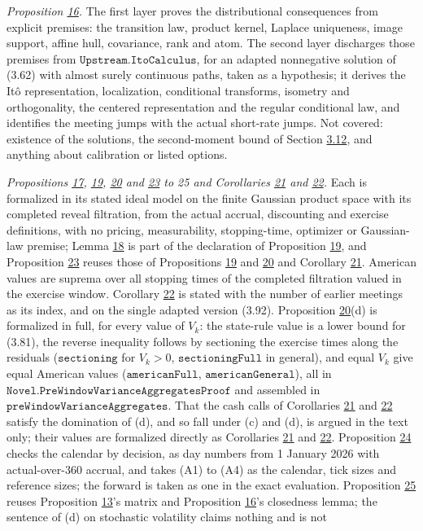 \documentclass[11pt]{article}
\begin{document}
\emph{Proposition \hyperref[res:Proposition-16]{16}.} The first layer proves the distributional consequences from explicit premises: the transition law, product kernel, Laplace uniqueness, image support, affine hull, covariance, rank and atom. The second layer discharges those premises from \(\texttt{Upstream.ItoCalculus}\), for an adapted nonnegative solution of (3.62) with almost surely continuous paths, taken as a hypothesis; it derives the Itô representation, localization, conditional transforms, isometry and orthogonality, the centered representation and the regular conditional law, and identifies the meeting jumps with the actual short-rate jumps. Not covered: existence of the solutions, the second-moment bound of Section \hyperref[sec:3.12]{3.12}, and anything about calibration or listed options.

\emph{Propositions \hyperref[res:Proposition-17]{17}, \hyperref[res:Proposition-19]{19}, \hyperref[res:Proposition-20]{20} and \hyperref[res:Proposition-23]{23} to 25 and Corollaries \hyperref[res:Corollary-21]{21} and \hyperref[res:Corollary-22]{22}.} Each is formalized in its stated ideal model on the finite Gaussian product space with its completed reveal filtration, from the actual accrual, discounting and exercise definitions, with no pricing, measurability, stopping-time, optimizer or Gaussian-law premise; Lemma \hyperref[res:Lemma-18]{18} is part of the declaration of Proposition \hyperref[res:Proposition-19]{19}, and Proposition \hyperref[res:Proposition-23]{23} reuses those of Propositions \hyperref[res:Proposition-19]{19} and \hyperref[res:Proposition-20]{20} and Corollary \hyperref[res:Corollary-21]{21}. American values are suprema over all stopping times of the completed filtration valued in the exercise window. Corollary \hyperref[res:Corollary-22]{22} is stated with the number of earlier meetings as its index, and on the single adapted version (3.92). Proposition \hyperref[res:Proposition-20]{20}(d) is formalized in full, for every value of \(V_k\): the state-rule value is a lower bound for (3.81), the reverse inequality follows by sectioning the exercise times along the residuals (\(\texttt{sectioning}\) for \(V_k>0\), \(\texttt{sectioningFull}\) in general), and equal \(V_k\) give equal American values (\(\texttt{americanFull}\), \(\texttt{americanGeneral}\)), all in \(\texttt{Novel.PreWindowVarianceAggregatesProof}\) and assembled in \(\texttt{preWindowVarianceAggregates}\). That the cash calls of Corollaries \hyperref[res:Corollary-21]{21} and \hyperref[res:Corollary-22]{22} satisfy the domination of (d), and so fall under (c) and (d), is argued in the text only; their values are formalized directly as Corollaries \hyperref[res:Corollary-21]{21} and \hyperref[res:Corollary-22]{22}. Proposition \hyperref[res:Proposition-24]{24} checks the calendar by decision, as day numbers from 1 January 2026 with actual-over-360 accrual, and takes (A1) to (A4) as the calendar, tick sizes and reference sizes; the forward is taken as one in the exact evaluation. Proposition \hyperref[res:Proposition-25]{25} reuses Proposition \hyperref[res:Proposition-13]{13}'s matrix and Proposition \hyperref[res:Proposition-16]{16}'s closedness lemma; the sentence of (d) on stochastic volatility claims nothing and is not 
\end{document}
